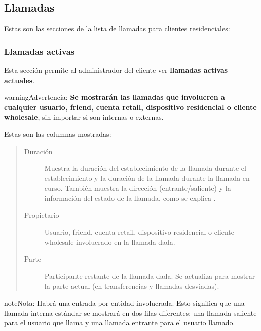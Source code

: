 \documentclass[letterpaper,10pt,spanish]{sphinxmanual}
\begin{document}
\subsection{Llamadas}
\label{administration_portal/client/residential/calls/index::doc}\label{administration_portal/client/residential/calls/index:calls}
Estas son las secciones de la lista de llamadas para clientes residenciales:


\subsubsection{Llamadas activas}
\label{administration_portal/client/residential/calls/active_calls::doc}\label{administration_portal/client/residential/calls/active_calls:active-calls}
Esta sección permite al administrador del cliente ver \textbf{llamadas activas actuales}.

\begin{notice}{warning}{Advertencia:}
\textbf{Se mostrarán las llamadas que involucren a cualquier usuario, friend, cuenta retail, dispositivo residencial o cliente wholesale}, sin importar si son internas o externas.
\end{notice}

Estas son las columnas mostradas:
\begin{quote}
\begin{description}
\item[{Duración}] \leavevmode
Muestra la duración del establecimiento de la llamada durante el establecimiento y la duración de la llamada durante la llamada en curso. También muestra la dirección (entrante/saliente) y la información del estado de la llamada, como se explica {\hyperref[administration_portal/platform/active_calls:call\string-state]{}}.

\item[{Propietario}] \leavevmode
Usuario, friend, cuenta retail, dispositivo residencial o cliente wholesale involucrado en la llamada dada.

\item[{Parte}] \leavevmode
Participante restante de la llamada dada. Se actualiza para mostrar la parte actual (en transferencias y llamadas desviadas).

\end{description}
\end{quote}

\begin{notice}{note}{Nota:}
Habrá una entrada por entidad involucrada. Esto significa que una llamada interna estándar se mostrará en dos filas diferentes: una llamada saliente para el usuario que llama y una llamada entrante para el usuario llamado.
\end{notice}
\end{document}
